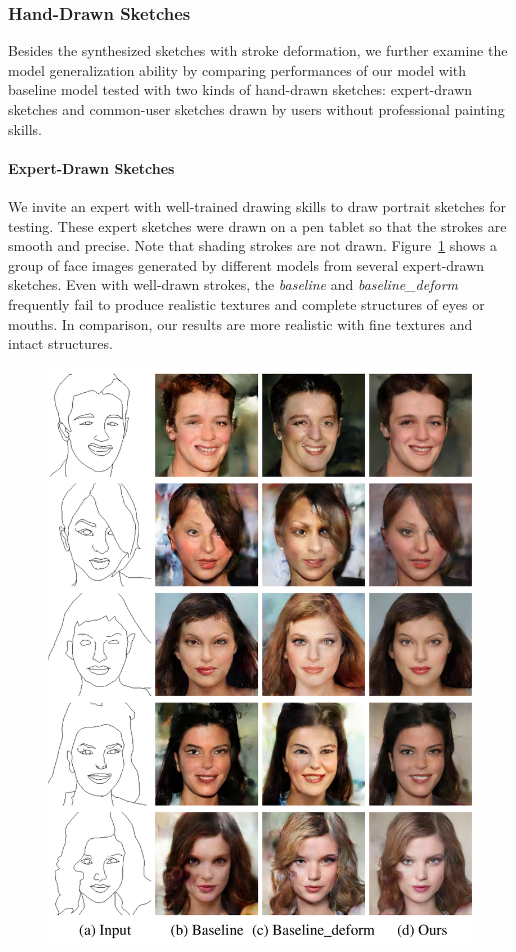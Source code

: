 \subsubsection{Hand-Drawn Sketches}
Besides the synthesized sketches with stroke deformation, we further examine the model generalization ability by comparing performances of our model with baseline model tested with two kinds of hand-drawn sketches: expert-drawn sketches and common-user sketches drawn by users without professional painting skills.

\paragraph{Expert-Drawn Sketches}
We invite an expert with well-trained drawing skills to draw portrait sketches for testing. 
These expert sketches were drawn on a pen tablet so that the strokes are smooth and precise. 
Note that shading strokes are not drawn. 
%
Figure~\ref{fig:expert_sketches} shows a group of face images generated by different models from several expert-drawn sketches. 
%
Even with well-drawn strokes, the \textit{baseline} and \textit{baseline\_deform} frequently fail to produce realistic textures and complete structures of eyes or mouths. 
%
In comparison, our results are more realistic with fine textures and intact structures. 

\begin{figure}
	\includegraphics[width=0.9\linewidth]{figs/expertsketches}
	\caption{}
	\label{fig:expert_sketches}
\end{figure}



